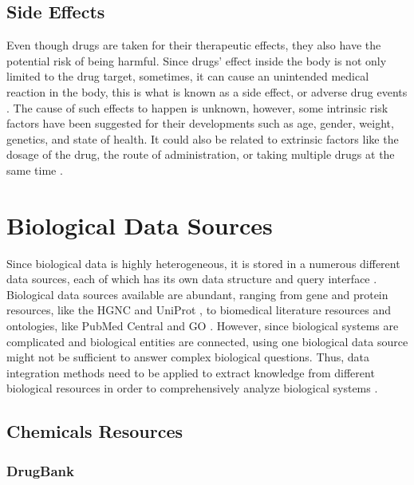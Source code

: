 \subsection{Side Effects}

Even though drugs are taken for their therapeutic effects, they also have the potential risk of being harmful.
Since drugs’ effect inside the body is not only limited to the drug target, sometimes, it can cause an unintended medical reaction in the body, this is what is known as a side effect, or adverse drug events \cite{pourpak_understanding_2008}.
The cause of such effects to happen is unknown, however, some intrinsic risk factors have been suggested for their developments such as age, gender, weight, genetics, and state of health.
It could also be related to extrinsic factors like the dosage of the drug, the route of administration, or taking multiple drugs at the same time \cite{pourpak_understanding_2008}.

\section{Biological Data Sources}

Since biological data is highly heterogeneous, it is stored in a numerous different data sources, each of which has its own data structure and query interface \cite{baralis_exploring_2008}.
Biological data sources available are abundant, ranging from gene and protein resources, like the \ac{HGNC} \cite{baralis_exploring_2008} and UniProt \cite{noauthor_uniprot:_2019}, to biomedical literature resources and ontologies, like PubMed Central \cite{roberts_pubmed_2001} and \ac{GO} \cite{noauthor_gene_2008}.
However, since biological systems are complicated and biological entities are connected, using one biological data source might not be sufficient to answer complex biological questions.
Thus, data integration methods need to be applied to extract knowledge from different biological resources in order to comprehensively analyze biological systems \cite{baralis_exploring_2008}.

\subsection{Chemicals Resources}

\subsubsection{DrugBank}

